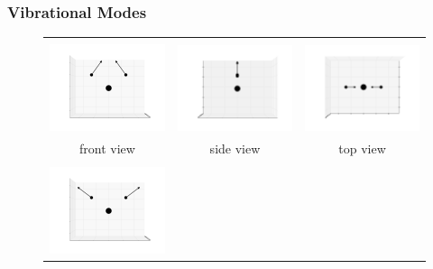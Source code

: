 \documentclass[11pt]{article}
\begin{document}
\subsubsection{Vibrational Modes}
\label{vib}
\begin{figure}[htp]
    \centering
    \begin{tabular}{|ccc|}\hline&&\\
    \includegraphics[width=5.5cm,clip=true,trim=3cm 2cm 3cm 2cm]{images/0-0_6.pdf}&
    \includegraphics[width=5.5cm,clip=true,trim=3cm 2cm 3cm 2cm]{images/0-90_6.pdf}&
    \includegraphics[width=5.5cm,clip=true,trim=3cm 2cm 3cm 2cm]{images/90-0_6.pdf}\\front view&side view&top view\\\hline&&\\
    \includegraphics[width=5.5cm,clip=true,trim=3cm 2cm 3cm 2cm]{images/0-0_7.pdf}&

\end{tabular}
\end{figure}
\end{document}
